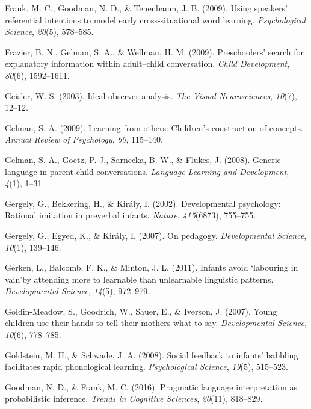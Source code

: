 \documentclass[english,floatsintext,man]{apa6}
\theoremstyle{definition}
\theoremstyle{definition}
\theoremstyle{definition}
\theoremstyle{remark}
\begin{document}
\hypertarget{ref-frank2009using}{}
Frank, M. C., Goodman, N. D., \& Tenenbaum, J. B. (2009). Using
speakers' referential intentions to model early cross-situational word
learning. \emph{Psychological Science}, \emph{20}(5), 578--585.

\hypertarget{ref-frazier2009preschoolers}{}
Frazier, B. N., Gelman, S. A., \& Wellman, H. M. (2009). Preschoolers'
search for explanatory information within adult--child conversation.
\emph{Child Development}, \emph{80}(6), 1592--1611.

\hypertarget{ref-geisler2003ideal}{}
Geisler, W. S. (2003). Ideal observer analysis. \emph{The Visual
Neurosciences}, \emph{10}(7), 12--12.

\hypertarget{ref-gelman2009learning}{}
Gelman, S. A. (2009). Learning from others: Children's construction of
concepts. \emph{Annual Review of Psychology}, \emph{60}, 115--140.

\hypertarget{ref-gelman2008generic}{}
Gelman, S. A., Goetz, P. J., Sarnecka, B. W., \& Flukes, J. (2008).
Generic language in parent-child conversations. \emph{Language Learning
and Development}, \emph{4}(1), 1--31.

\hypertarget{ref-gergely2002developmental}{}
Gergely, G., Bekkering, H., \& Király, I. (2002). Developmental
psychology: Rational imitation in preverbal infants. \emph{Nature},
\emph{415}(6873), 755--755.

\hypertarget{ref-gergely2007pedagogy}{}
Gergely, G., Egyed, K., \& Király, I. (2007). On pedagogy.
\emph{Developmental Science}, \emph{10}(1), 139--146.

\hypertarget{ref-gerken2011infants}{}
Gerken, L., Balcomb, F. K., \& Minton, J. L. (2011). Infants avoid
`labouring in vain'by attending more to learnable than unlearnable
linguistic patterns. \emph{Developmental Science}, \emph{14}(5),
972--979.

\hypertarget{ref-goldin2007young}{}
Goldin-Meadow, S., Goodrich, W., Sauer, E., \& Iverson, J. (2007). Young
children use their hands to tell their mothers what to say.
\emph{Developmental Science}, \emph{10}(6), 778--785.

\hypertarget{ref-goldstein2008social}{}
Goldstein, M. H., \& Schwade, J. A. (2008). Social feedback to infants'
babbling facilitates rapid phonological learning. \emph{Psychological
Science}, \emph{19}(5), 515--523.

\hypertarget{ref-goodman2016pragmatic}{}
Goodman, N. D., \& Frank, M. C. (2016). Pragmatic language
interpretation as probabilistic inference. \emph{Trends in Cognitive
Sciences}, \emph{20}(11), 818--829.
\end{document}
